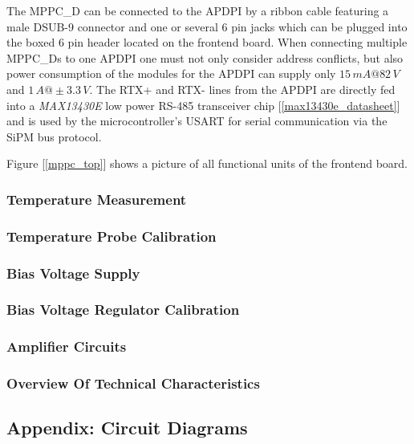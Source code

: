 The MPPC\_D can be connected to the APDPI by a ribbon cable featuring a male DSUB-9 connector and one or several 6 pin jacks which can be plugged into the boxed 6 pin header
located on the frontend board. When connecting multiple MPPC\_Ds to one APDPI one must not only consider address conflicts, but also power consumption of the modules for the APDPI
can supply only $15\,mA@82\,V$ and $1\,A@\pm3.3\,V$. The RTX+ and RTX- lines from the APDPI are directly fed into a \emph{MAX13430E} low power RS-485 transceiver chip 
[\ref{max13430e_datasheet}] and is used by the microcontroller's USART for serial communication via the SiPM bus protocol.  

Figure [\ref{mppc_top}] shows a picture of all functional units of the frontend board.

\subsubsection{Temperature Measurement}

\subsubsection{Temperature Probe Calibration}
\subsubsection{Bias Voltage Supply}
\subsubsection{Bias Voltage Regulator Calibration}
\subsubsection{Amplifier Circuits}
\subsubsection{Overview Of Technical Characteristics}

\subsection{Appendix: Circuit Diagrams}
